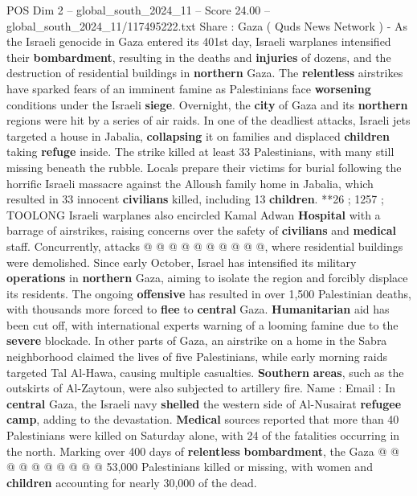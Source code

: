 \begin{textsample}{POS Dim 2 – global\_south\_2024\_11 – Score 24.00 – global\_south\_2024\_11/117495222.txt}  \label{ex:f2_pos_250}
Share : Gaza ( Quds News Network ) - As the Israeli genocide in Gaza entered its 401st day, Israeli warplanes intensified their \textbf{bombardment}, resulting in the deaths and \textbf{injuries} of dozens, and the destruction of residential buildings in \textbf{northern} Gaza.
The \textbf{relentless} airstrikes have sparked fears of an imminent famine as Palestinians face \textbf{worsening} conditions under the Israeli \textbf{siege}.
Overnight, the \textbf{city} of Gaza and its \textbf{northern} regions were hit by a series of air raids.
In one of the deadliest attacks, Israeli jets targeted a house in Jabalia, \textbf{collapsing} it on families and displaced \textbf{children} taking \textbf{refuge} inside.
The strike killed at least 33 Palestinians, with many still missing beneath the rubble.
Locals prepare their victims for burial following the horrific Israeli massacre against the Alloush family home in Jabalia, which resulted in 33 innocent \textbf{civilians} killed, including 13 \textbf{children}. **26 ; 1257 ; TOOLONG Israeli warplanes also encircled Kamal Adwan \textbf{Hospital} with a barrage of airstrikes, raising concerns over the safety of \textbf{civilians} and \textbf{medical} staff.
Concurrently, attacks @ @ @ @ @ @ @ @ @ @, where residential buildings were demolished.
Since early October, Israel has intensified its military \textbf{operations} in \textbf{northern} Gaza, aiming to isolate the region and forcibly displace its residents.
The ongoing \textbf{offensive} has resulted in over 1,500 Palestinian deaths, with thousands more forced to \textbf{flee} to \textbf{central} Gaza. \textbf{Humanitarian} aid has been cut off, with international experts warning of a looming famine due to the \textbf{severe} blockade.
In other parts of Gaza, an airstrike on a home in the Sabra neighborhood claimed the lives of five Palestinians, while early morning raids targeted Tal Al-Hawa, causing multiple casualties. \textbf{Southern} \textbf{areas}, such as the outskirts of Al-Zaytoun, were also subjected to artillery fire.
Name : Email : In \textbf{central} Gaza, the Israeli navy \textbf{shelled} the western side of Al-Nusairat \textbf{refugee} \textbf{camp}, adding to the devastation. \textbf{Medical} sources reported that more than 40 Palestinians were killed on Saturday alone, with 24 of the fatalities occurring in the north.
Marking over 400 days of \textbf{relentless} \textbf{bombardment}, the Gaza @ @ @ @ @ @ @ @ @ @ 53,000 Palestinians killed or missing, with women and \textbf{children} accounting for nearly 30,000 of the dead.

\end{textsample}
